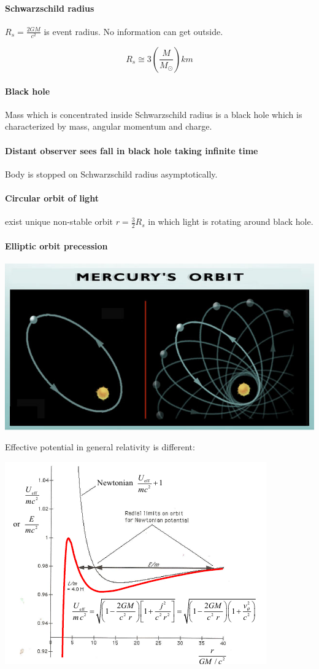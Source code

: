 \paragraph{Schwarzschild radius} $R_s = \frac{2GM}{c^2}$ is event radius. No information can get outside.

$$R_s \cong 3 \left( \frac{M}{M_{\odot}} \right)km$$

\paragraph{Black hole} Mass which is concentrated inside Schwarzschild radius is a black hole which is characterized by mass, angular momentum and charge.
\paragraph{Distant observer sees fall in black hole taking infinite time} Body is stopped on Schwarzschild radius asymptotically.
\paragraph{Circular orbit of light} exist unique non-stable orbit $r = \frac{3}{2}R_s$ in which light is rotating around black hole.
\paragraph{Elliptic orbit precession}

\begin{center}
	\includegraphics[width=0.5\linewidth]{./lect26/pic1.png}
\end{center}
Effective potential in general relativity is different:
\begin{center}
	\includegraphics[width=0.5\linewidth]{./lect26/pic2.png}
\end{center}

